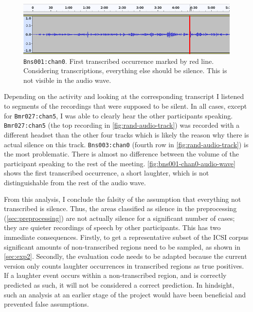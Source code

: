 \documentclass[bsc,frontabs,parskip,deptreport]{infthesis}
\begin{document}
\begin{figure}
    \centering
    \includegraphics[width=12cm]{imgs/audio_waves/Bns003_cha0_first_transcribed_occurence.png}
    \caption{\texttt{Bns001:chan0}. First transcribed occurrence marked by red line. Considering transcriptions, everything else should be silence. This is not visible in the audio wave.}
    \label{fig:bns001-chan0-audio-wave}
\end{figure}
Depending on the activity and looking at the corresponding transcript I listened to segments of the recordings that were supposed to be silent. In all cases, except for \verb|Bmr027:chan5|, I was able to clearly hear the other participants speaking. 
\verb|Bmr027:chan5| (the top recording in \autoref{fig:rand-audio-track}) was recorded with a different headset than the other four tracks which is likely the reason why there is actual silence on this track.
\verb|Bns003:chan0| (fourth row in \autoref{fig:rand-audio-track}) is the most problematic. There is almost no difference between the volume of the participant speaking to the rest of the meeting. \autoref{fig:bns001-chan0-audio-wave} shows the first transcribed occurrence, a short laughter, which is not distinguishable from the rest of the audio wave.

From this analysis, I conclude the falsity of the assumption that everything not transcribed is silence. Thus, the areas classified as silence in the preprocessing (\ref{sec:preprocessing}) are not actually silence for a significant number of cases; they are quieter recordings of speech by other participants. 
This has two immediate consequences. Firstly, to get a representative subset of the ICSI corpus significant amounts of non-transcribed regions need to be sampled, as shown in \autoref{sec:exp2}. Secondly, the evaluation code needs to be adapted because the current version \citep{Wolter_A_Machine_Learning_2022} only counts laughter occurrences in transcribed regions as true positives. If a laughter event occurs within a non-transcribed region, and is correctly predicted as such, it will not be considered a correct prediction. 
In hindsight, such an analysis at an earlier stage of the project would have been beneficial and prevented false assumptions. 
\end{document}

